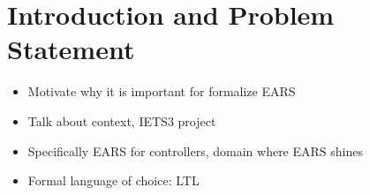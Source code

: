 \section{Introduction and Problem Statement}

\begin{itemize}
  \item Motivate why it is important for formalize EARS
  \item Talk about context, IETS3 project
  \item Specifically EARS for controllers, domain where EARS shines 
  \item Formal language of choice: LTL
\end{itemize}